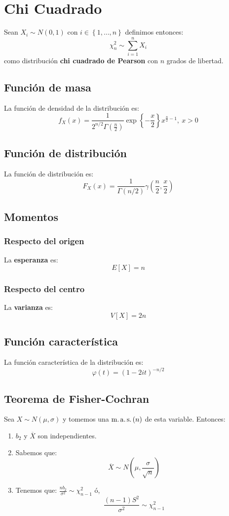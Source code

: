 \section{Chi Cuadrado}
\label{sec:chi_cuadrado}
Sean $X_i \sim N\left( 0, 1 \right)$ con $i \in \left\{ 1, \ldots, n \right\}$ definimos entonces:
\[
\chi^2_n \sim \sum_{i=1}^{n} X_i
\]
como distribución \textbf{chi cuadrado de Pearson} con $n$ grados de libertad.

\subsection{Función de masa}
La función de densidad de la distribución es:
\[
f_X \left( x \right) = \frac{1}{2^{n/2}\Gamma\left( \frac{n}{2} \right)}\exp\left\{ -\frac{x}{2} \right\} x^{\frac{n}{2} - 1},\ x > 0
\]

\subsection{Función de distribución}
La función de distribución es:
\[
F_X\left( x \right) = \frac{1}{\Gamma\left( n / 2 \right)}\gamma\left( \frac{n}{2}, \frac{x}{2} \right)
\]

\subsection{Momentos}

\subsubsection*{Respecto del origen}
La \textbf{esperanza} es: 
\[
    E\left[ X \right] = n
\]
\subsubsection*{Respecto del centro}
La \textbf{varianza} es:
\[
    V\left[ X \right] = 2n
\]

\subsection{Función característica}
La función característica de la distribución es:
\[
\varphi\left( t \right) = \left( 1 - 2it \right)^{-n/2}
\]

\subsection{Teorema de Fisher-Cochran}
Sea $X \sim N\left( \mu, \sigma \right)$ y tomemos una $\operatorname{m.a.s.}\left( n \right)$ de esta variable. 
Entonces:
\begin{enumerate}
    \item $b_2$ y $\overline{X}$ son independientes.
    \item Sabemos que:
    \[
    \boxed{\overline{X} \sim N\left( \mu, \frac{\sigma}{\sqrt{n}} \right)}
    \]
    \item Tenemos que: $\frac{nb_2}{\sigma^2} \sim \chi^2_{n-1}$ ó,
    \[
    \boxed{\frac{\left( n-1 \right)S^2}{\sigma^2} \sim \chi^2_{n-1}}
    \]
\end{enumerate}

